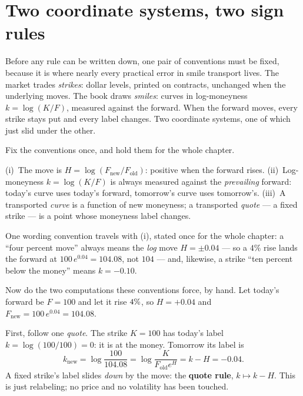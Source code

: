 \section{Two coordinate systems, two sign rules}
\label{sec:ssrsigns}

Before any rule can be written down, one pair of conventions must be
fixed, because it is where nearly every practical error in smile
transport lives.  The market trades \emph{strikes}: dollar levels,
printed on contracts, unchanged when the underlying moves.  The book
draws \emph{smiles}: curves in log-moneyness $k=\log(K/F)$, measured
against the forward.  When the forward moves, every strike stays put
and every label changes.  Two coordinate systems, one of which just
slid under the other.

Fix the conventions once, and hold them for the whole chapter.

\begin{definition}
\label{def:ssrsigns}
(i)~The move is $H=\log(F_{\mathrm{new}}/F_{\mathrm{old}})$: positive
when the forward rises.  (ii)~Log-moneyness $k=\log(K/F)$ is always
measured against the \emph{prevailing} forward: today's curve uses
today's forward, tomorrow's curve uses tomorrow's.  (iii)~A
transported \emph{curve} is a function of new moneyness; a transported
\emph{quote} --- a fixed strike --- is a point whose moneyness label
changes.
\end{definition}

One wording convention travels with (i), stated once for the whole
chapter: a ``four percent move'' always means the \emph{log} move
$H=\pm0.04$ --- so a $4\%$ rise lands the forward at
$100\,e^{0.04}=104.08$, not $104$ --- and, likewise, a strike ``ten
percent below the money'' means $k=-0.10$.

Now do the two computations these conventions force, by hand.  Let
today's forward be $F=100$ and let it rise
$4\%$, so $H=+0.04$ and
$F_{\mathrm{new}}=100\,e^{0.04}=104.08$.

First, follow one \emph{quote}.  The strike $K=100$ has today's label
$k=\log(100/100)=0$: it is at the money.  Tomorrow its label is
\[
k_{\mathrm{new}}
=\log\!\frac{100}{104.08}
=\log\!\frac{K}{F_{\mathrm{old}}e^{H}}
=k-H=-0.04 .
\]
A fixed strike's label slides \emph{down} by the move: the
\textbf{quote rule}, $k\mapsto k-H$.  This is just relabeling; no
price and no volatility has been touched.

